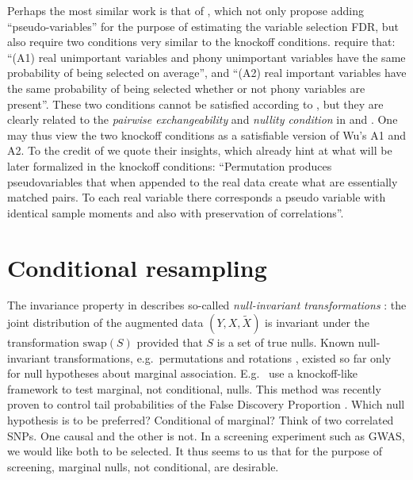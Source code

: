 \documentclass[article,lineno]{biometrika}
\begin{document}
	Perhaps the most similar work is that of \cite{WuControllingVariableSelection2007}, which not only propose adding ``pseudo-variables'' for the purpose of estimating the variable selection \rm{FDR}, but also require two conditions very similar to the knockoff conditions.
	\cite{WuControllingVariableSelection2007} require that:
	``(A1) real unimportant variables and phony unimportant variables have the same probability of being selected on average'', and
	``(A2) real important variables have the same probability of being selected whether or not phony variables are present''.
	These two conditions cannot be satisfied according to \cite{WuControllingVariableSelection2007}, but they are clearly related to the \emph{pairwise exchangeability} and \emph{nullity condition} in \cite{SesiaGenehuntinghidden} and \cite{CandesPanninggoldmodelX2018}.
	One may thus view the two knockoff conditions as a satisfiable version of Wu's A1 and A2.
	To the credit of \cite{WuControllingVariableSelection2007} we quote their insights, which already hint at what will be later formalized in the knockoff conditions:
	``Permutation produces pseudovariables that when appended to the real data create what
	are essentially matched pairs. To each real variable there corresponds a pseudo variable with identical sample moments and also with preservation of correlations''.
	
	
	
	\section{Conditional resampling}
	The invariance property in \cite{SesiaGenehuntinghidden} describes so-called \emph{null-invariant transformations} \citep{Goeman2010}:
	the joint distribution of the augmented data $(Y,X,\tilde X)$ is invariant under the transformation $\textrm{swap}(S)$ provided that $S$ is a set of true nulls.
	Known null-invariant transformations, e.g.\ permutations and rotations \citep{Langsrud2005}, existed so far only for null hypotheses about marginal association.
	E.g.\ \citet{TusherSignificanceanalysismicroarrays2001} use a knockoff-like framework to test marginal, not conditional, nulls. This method was recently proven to control tail probabilities of the False Discovery Proportion \citep{Hemerik2018}.
	Which null hypothesis is to be preferred? Conditional of marginal?
	Think of two correlated SNPs.
	One causal and the other is not.
	In a screening experiment such as GWAS, we would like both to be selected.
	It thus seems to us that for the purpose of screening, marginal nulls, not conditional, are desirable.
	
\end{document}
